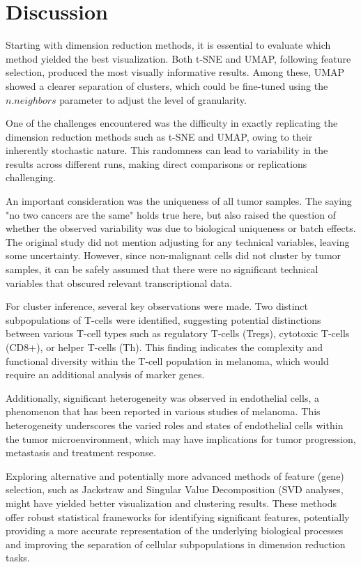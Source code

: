 \documentclass[11pt]{article}
\begin{document}
\section{Discussion}
    \begin{multicols}{2}
    \noindent
    Starting with dimension reduction methods, it is essential to evaluate which method yielded the best visualization. Both t-SNE and UMAP, following feature selection, produced the most visually informative results. Among these, UMAP showed a clearer separation of clusters, which could be fine-tuned using the $n.neighbors$ parameter to adjust the level of granularity.
    
    One of the challenges encountered was the difficulty in exactly replicating the dimension reduction methods such as t-SNE and UMAP, owing to their inherently stochastic nature. This randomness can lead to variability in the results across different runs, making direct comparisons or replications challenging.
    
    An important consideration was the uniqueness of all tumor samples. The saying "no two cancers are the same" holds true here, but also raised the question of whether the observed variability was due to biological uniqueness or batch effects. The original study did not mention adjusting for any technical variables, leaving some uncertainty. However, since non-malignant cells did not cluster by tumor samples, it can be safely assumed that there were no significant technical variables that obscured relevant transcriptional data.

    For cluster inference, several key observations were made. Two distinct subpopulations of T-cells were identified, suggesting potential distinctions between various T-cell types such as regulatory T-cells (Tregs), cytotoxic T-cells (CD8+), or helper T-cells (Th). This finding indicates the complexity and functional diversity within the T-cell population in melanoma, which would require an additional analysis of marker genes.
    
    Additionally, significant heterogeneity was observed in endothelial cells, a phenomenon that has been reported in various studies of melanoma\cite{zeng_understanding_2023, maishi_tumor_2019}. This heterogeneity underscores the varied roles and states of endothelial cells within the tumor microenvironment, which may have implications for tumor progression, metastasis and treatment response\cite{maishi_tumor_2019}.
    
    Exploring alternative and potentially more advanced methods of feature (gene) selection, such as Jackstraw\cite{chung_statistical_2020} and Singular Value Decomposition (SVD\cite{klema_singular_1980} analyses, might have yielded better visualization and clustering results. These methods offer robust statistical frameworks for identifying significant features, potentially providing a more accurate representation of the underlying biological processes and improving the separation of cellular subpopulations in dimension reduction tasks.
    

\end{multicols}
\end{document}
